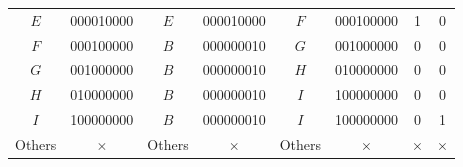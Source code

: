 \documentclass[13pt,a4paper]{report}
\begin{document}
\begin{table}[H]
\begin{tabular}{cc|cccc|cc}
$E$                          & 000010000                                                                    & $E$                          & 000010000                                                                   & $F$                          & 000100000                                                                    & 1                            & 0                            \\
$F$                          & 000100000                                                                    & $B$                          & 000000010                                                                   & $G$                          & 001000000                                                                    & 0                            & 0                            \\
$G$                          & 001000000                                                                    & $B$                          & 000000010                                                                   & $H$                          & 010000000                                                                    & 0                            & 0                            \\
$H$                          & 010000000                                                                    & $B$                          & 000000010                                                                   & $I$                          & 100000000                                                                    & 0                            & 0                            \\
$I$                          & 100000000                                                                    & $B$                          & 000000010                                                                   & $I$                          & 100000000                                                                    & 0                            & 1                            \\
\multicolumn{1}{l}{Others} & \multicolumn{1}{c|}{$\times$} & \multicolumn{1}{l}{Others} & \multicolumn{1}{c}{$\times$} & \multicolumn{1}{l}{Others} & \multicolumn{1}{c|}{$\times$} & \multicolumn{1}{c}{$\times$} & \multicolumn{1}{c}{$\times$}
\end{tabular}
\end{table}
\end{document}
